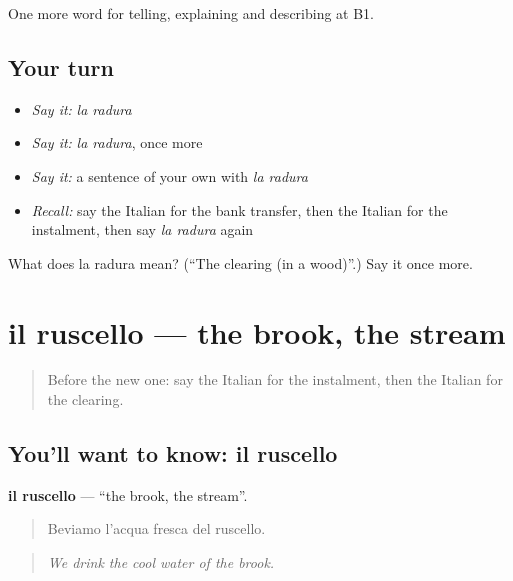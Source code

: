 \begin{grammarlens}[title={What you've built}]
One more word for telling, explaining and describing at B1.
\end{grammarlens}

\subsection*{Your turn}
\begin{itemize}
\raggedright
  \item \emph{Say it:} \emph{la radura}
  \item \emph{Say it:} \emph{la radura}, once more
  \item \emph{Say it:} a sentence of your own with \emph{la radura}
  \item \emph{Recall:} say the Italian for the bank transfer, then the Italian for the instalment, then say \emph{la radura} again
\end{itemize}

\begin{tcolorbox}[breakable,colback=teal!4,colframe=teal!35!black,title={Before you move on}]
What does la radura mean? (\textquotedblleft{}The clearing (in a wood)\textquotedblright{}.) Say it once more.
\end{tcolorbox}
\section[il ruscello]{il ruscello — the brook, the stream}

\label{lesson:IT-C460-ruscello}



\begin{quote}
Before the new one: say the Italian for the instalment, then the Italian for the clearing.
\end{quote}

\subsection*{You'll want to know: il ruscello}
\textbf{il ruscello} — \textquotedblleft{}the brook, the stream\textquotedblright{}.

\begin{quote}
Beviamo l'acqua fresca del ruscello.
\end{quote}

\begin{quote}
\emph{We drink the cool water of the brook.}
\end{quote}

